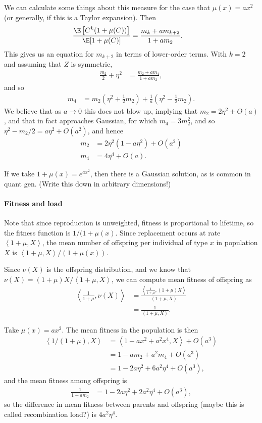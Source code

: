 \documentclass{article}
\newcommand{\ip}[2]{\left\langle #1, #2 \right\rangle}
\begin{document}
We can calculate some things about this measure
for the case that $\mu(x) = ax^2$ 
(or generally, if this is a Taylor expansion).
Then
$$\begin{aligned}
    \frac{\E\left[ C^k (1+\mu(C)) \right]}{\E[1+\mu(C)]} 
    &=
    \frac{ m_k + a m_{k+2} }{ 1 + a m_2 } .
\end{aligned}$$
This gives us an equation for $m_{k+2}$ in terms of lower-order terms.
With $k=2$ and assuming that $Z$ is symmetric,
$$\begin{aligned}
    \frac{m_2}{2} + \eta^2
    &=
    \frac{ m_2 + a m_4 }{ 1 + a m_2 },
\end{aligned}$$
and so 
$$\begin{aligned}
    m_4
    &= m_2 \left( \eta^2 + \frac{1}{2} m_2 \right) 
       + \frac{1}{a} \left( \eta^2 - \frac{1}{2} m_2 \right) .
\end{aligned}$$
We believe that as $a \to 0$ this does not blow up,
implying that $m_2 = 2 \eta^2 + O(a)$,
and that in fact approaches Gaussian, for which $m_4 = 3m_2^2$,
and so $\eta^2 - m_2/2 = a \eta^2 + O(a^2)$,
and hence
$$\begin{aligned}
    m_2 &= 2 \eta^2 ( 1 - a \eta^2 ) + O(a^2)  \\
    m_4 &= 4 \eta^4 + O(a) .
\end{aligned}$$

If we take $1+\mu(x) = e^{ax^2}$,
then there is a Gaussian solution,
as is common in quant gen.
(Write this down in arbitrary dimensions!)


\paragraph{Fitness and load}
Note that since reproduction is unweighted,
fitness is proportional to lifetime,
so the fitness function is $1/(1+\mu(x)$.
Since replacement occurs at rate $\ip{1+\mu}{X}$,
the mean number of offspring per individual of type $x$
in population $X$ is $\ip{1+\mu}{X} / (1+\mu(x))$.

Since $\nu(X)$ is the offspring distribution,
and we know that $\nu(X) = (1+\mu) X / \ip{1+\mu}{X}$,
we can compute mean fitness of offspring as
$$\begin{aligned}
    \ip{\frac{1}{1+\mu}}{\nu(X)}
    &=
    \frac{\ip{\frac{1}{1+\mu}}{(1+\mu)X}}{\ip{1+\mu}{X}} \\
    &=
    \frac{1}{\ip{1+\mu}{X}} .
\end{aligned}$$

Take $\mu(x) = ax^2$.
The mean fitness in the population is then
$$\begin{aligned}
    \ip{1/(1+\mu)}{X}
    &=
    \ip{1 - ax^2 + a^2 x^4}{X} + O(a^3) \\
    &=
    1 - a m_2 + a^2 m_4 + O(a^3) \\
    &=
    1 - 2 a \eta^2 + 6 a^2 \eta^4 + O(a^3) ,
\end{aligned}$$
and the mean fitness among offspring is
$$\begin{aligned}
    \frac{1}{1+am_2} 
    &= 1 - 2 a \eta^2 + 2 a^2 \eta^4 + O(a^3),
\end{aligned}$$
so the difference in mean fitness between parents and offspring
(maybe this is called recombination load?)
is $4 a^2 \eta^4$.
\end{document}

